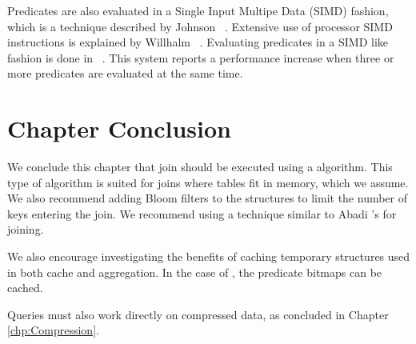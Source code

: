 Predicates are also evaluated in a Single Input Multipe Data (SIMD) fashion, which is a technique described by Johnson \ea~\cite{Johnson2008-cp}. Extensive use of processor SIMD instructions is explained by Willhalm \ea~\cite{Willhalm2009-hu, Willhalm2013-ri}. Evaluating predicates in a SIMD like fashion is done in \blink~\cite{Raman2008-gi}.  This system reports a performance increase when three or more predicates are evaluated at the same time.

\section{Chapter Conclusion}
\label{sec:Chapter Conclusion}
We conclude this chapter that join should be executed using a  algorithm. This type of algorithm is suited for joins where tables fit in memory, which we assume. We also recommend adding Bloom filters to the structures to limit the number of keys entering the join. We recommend using a technique similar to Abadi \ea's  for joining.

We also encourage investigating the benefits of caching temporary structures used in both cache and aggregation. In the case of , the predicate bitmaps can be cached.

Queries must also work directly on compressed data, as concluded in Chapter \ref{chp:Compression}.
